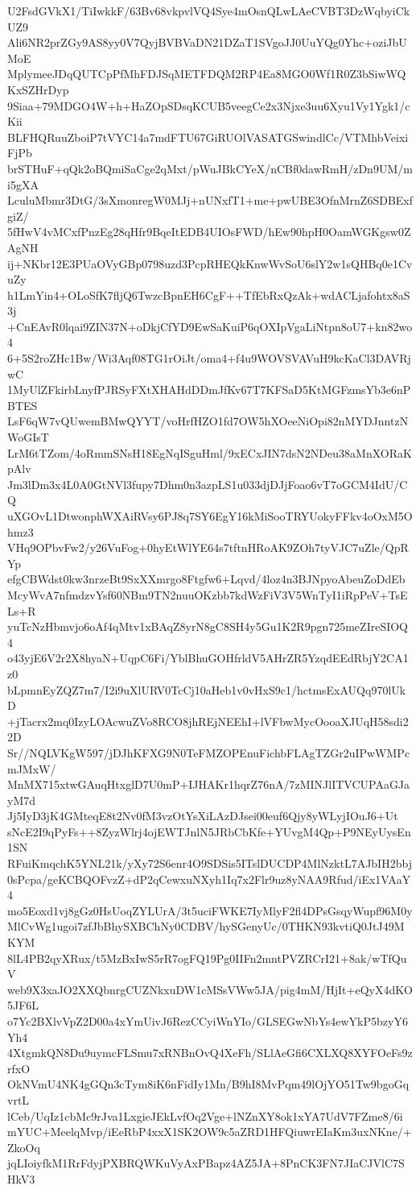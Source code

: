 U2FsdGVkX1/TiIwkkF/63Bv68vkpvlVQ4Sye4mOsnQLwLAeCVBT3DzWqbyiCkUZ9
Ali6NR2prZGy9AS8yy0V7QyjBVBVaDN21DZaT1SVgoJJ0UuYQg0Yhc+oziJbUMoE
MplymeeJDqQUTCpPfMhFDJSqMETFDQM2RP4Ea8MGO0Wf1R0Z3bSiwWQKxSZHrDyp
9Siaa+79MDGO4W+h+HaZOpSDsqKCUB5veegCe2x3Njxe3uu6Xyu1Vy1Ygk1/cKii
BLFHQRuuZboiP7tVYC14a7mdFTU67GiRUOlVASATGSwindlCc/VTMhbVeixiFjPb
brSTHuF+qQk2oBQmiSaCge2qMxt/pWuJBkCYeX/nCBf0dawRmH/zDn9UM/mi5gXA
LculuMbmr3DtG/3sXmonregW0MJj+nUNxfT1+me+pwUBE3OfnMrnZ6SDBExfgiZ/
5fHwV4vMCxfPnzEg28qHfr9BqeItEDB4UIOsFWD/hEw90hpH0OamWGKgsw0ZAgNH
ij+NKbr12E3PUaOVyGBp0798uzd3PcpRHEQkKnwWvSoU6slY2w1sQHBq0e1CvuZy
h1LmYin4+OLoSfK7fljQ6TwzcBpnEH6CgF++TfEbRxQzAk+wdACLjafohtx8aS3j
+CnEAvR0lqai9ZIN37N+oDkjCfYD9EwSaKuiP6qOXIpVgaLiNtpn8oU7+kn82wo4
6+5S2roZHc1Bw/Wi3Aqf08TG1rOiJt/oma4+f4u9WOVSVAVuH9kcKaCl3DAVRjwC
1MyUlZFkirbLnyfPJRSyFXtXHAHdDDmJfKv67T7KFSaD5KtMGFzmsYb3e6nPBTES
LsF6qW7vQUwemBMwQYYT/voHrfHZO1fd7OW5hXOeeNiOpi82nMYDJnntzNWoGIsT
LrM6tTZom/4oRmmSNsH18EgNqISguHml/9xECxJIN7dsN2NDeu38aMnXORaKpAlv
Jm3lDm3x4L0A0GtNVl3fupy7Dhm0n3azpLS1u033djDJjFoao6vT7oGCM4IdU/CQ
uXGOvL1DtwonphWXAiRVsy6PJ8q7SY6EgY16kMiSooTRYUokyFFkv4oOxM5Ohmz3
VHq9OPbvFw2/y26VuFog+0hyEtWlYE64s7tftnHRoAK9ZOh7tyVJC7uZle/QpRYp
efgCBWdst0kw3nrzeBt9SxXXmrgo8Ftgfw6+Lqvd/4loz4n3BJNpyoAbeuZoDdEb
McyWvA7nfmdzvYsf60NBm9TN2nuuOKzbb7kdWzFiV3V5WnTyI1iRpPeV+TsELs+R
yuTcNzHbmvjo6oAf4qMtv1xBAqZ8yrN8gC8SH4y5Gu1K2R9pgn725meZIreSIOQ4
o43yjE6V2r2X8hyaN+UqpC6Fi/YblBhuGOHfrldV5AHrZR5YzqdEEdRbjY2CA1z0
bLpmnEyZQZ7m7/I2i9uXlURV0TcCj10aHeb1v0vHxS9c1/hctmsExAUQq970lUkD
+jTacrx2mq0IzyLOAcwuZVo8RCO8jhREjNEEhI+lVFbwMycOooaXJUqH58sdi22D
Sr//NQLVKgW597/jDJhKFXG9N0TeFMZOPEnuFichbFLAgTZGr2uIPwWMPcmJMxW/
MnMX715xtwGAuqHtxglD7U0mP+IJHAKr1hqrZ76nA/7zMINJlITVCUPAaGJayM7d
Jj5IyD3jK4GMteqE8t2Nv0fM3vzOtYsXiLAzDJsei00euf6Qjy8yWLyjIOuJ6+Ut
sNcE2I9qPyFs++8ZyzWlrj4ojEWTJnlN5JRbCbKfe+YUvgM4Qp+P9NEyUysEn1SN
RFuiKmqchK5YNL21k/yXy72S6enr4O9SDSis5ITslDUCDP4MlNzktL7AJbIH2bbj
0sPcpa/geKCBQOFvzZ+dP2qCewxuNXyh1Iq7x2Flr9uz8yNAA9Rfud/iEx1VAaY4
mo5Eoxd1vj8gGz0HsUoqZYLUrA/3t5uciFWKE7IyMlyF2fl4DPsGsqyWupf96M0y
MlCvWg1ugoi7zfJbBhySXBChNy0CDBV/hySGenyUc/0THKN93kvtiQ0JtJ49MKYM
8lL4PB2qyXRux/t5MzBxIwS5rR7ogFQ19Pg0IIFn2mntPVZRCrI21+8ak/wTfQuV
web9X3xaJO2XXQbnrgCUZNkxuDW1cMSsVWw5JA/pig4mM/HjIt+eQyX4dKO5JF6L
o7Yc2BXlvVpZ2D00a4xYmUivJ6RezCCyiWnYIo/GLSEGwNbYs4ewYkP5bzyY6Yh4
4XtgmkQN8Du9uymcFLSmu7xRNBnOvQ4XeFh/SLlAeGfi6CXLXQ8XYFOeFs9zrfxO
OkNVmU4NK4gGQn3cTym8iK6nFidIy1Mn/B9hI8MvPqm49lOjYO51Tw9bgoGqvrtL
lCeb/UqIz1cbMc9rJva1LxgieJEkLvfOq2Vge+lNZnXY8ok1xYA7UdV7FZme8/6i
mYUC+MeelqMvp/iEeRbP4xxX1SK2OW9c5aZRD1HFQiuwrEIaKm3uxNKne/+ZkoOq
jqLIoiyfkM1RrFdyjPXBRQWKuVyAxPBapz4AZ5JA+8PnCK3FN7JIaCJVlC7SHkV3
